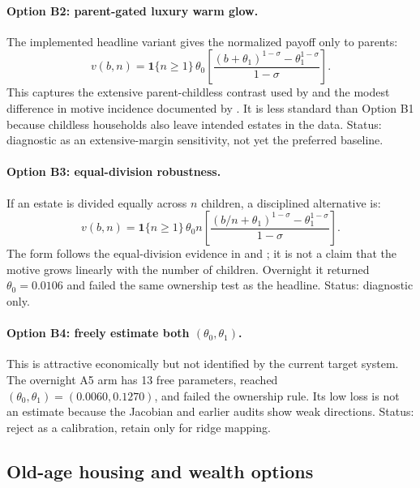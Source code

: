 \documentclass[10pt]{article}
\newcommand{\one}{\mathbf{1}}
\newcommand{\bad}{\textcolor{red!65!black}{reject}}
\newcommand{\diag}{\textcolor{blue!65!black}{diagnostic}}
\begin{document}
\paragraph{Option B2: parent-gated luxury warm glow.}
The implemented headline variant gives the normalized payoff only to parents:
\begin{equation}
v(b,n)=\one\{n\geq1\}\,\theta_0\left[
\frac{(b+\theta_1)^{1-\sigma}-\theta_1^{1-\sigma}}{1-\sigma}
\right].
\label{eq:parentgate}
\end{equation}
This captures the extensive parent-childless contrast used by \citet{hurd1989}
and the modest difference in motive incidence documented by
\citet{kopczuk2007}. It is less standard than Option B1 because childless
households also leave intended estates in the data. Status: \diag{} as an
extensive-margin sensitivity, not yet the preferred baseline.

\paragraph{Option B3: equal-division robustness.}
If an estate is divided equally across $n$ children, a disciplined alternative
is:
\begin{equation}
v(b,n)=\one\{n\geq1\}\,\theta_0 n\left[
\frac{(b/n+\theta_1)^{1-\sigma}-\theta_1^{1-\sigma}}{1-\sigma}
\right].
\label{eq:equaldivision}
\end{equation}
The form follows the equal-division evidence in \citet{mcgarry1999} and
\citet{wilhelm1996}; it is not a claim that the motive grows linearly with the
number of children. Overnight it returned $\theta_0=0.0106$ and failed the same
ownership test as the headline. Status: \diag{} only.

\paragraph{Option B4: freely estimate both $(\theta_0,\theta_1)$.}
This is attractive economically but not identified by the current target
system. The overnight A5 arm has 13 free parameters, reached
$(\theta_0,\theta_1)=(0.0060,0.1270)$, and failed the ownership rule. Its low
loss is not an estimate because the Jacobian and earlier audits show weak
directions. Status: \bad{} as a calibration, retain only for ridge mapping.

\subsection{Old-age housing and wealth options}
\end{document}
